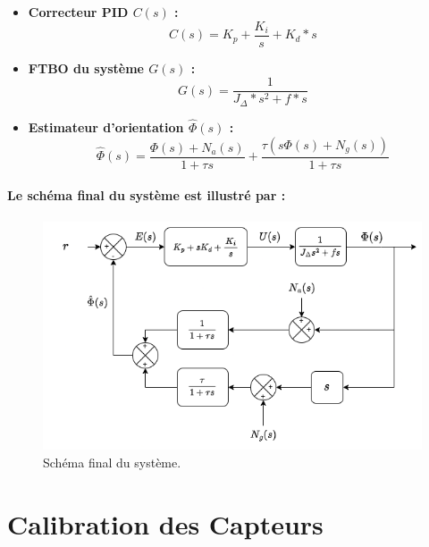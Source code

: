 \begin{itemize}
	\item \textbf{Correcteur PID $C(s)$ :} \begin{equation}
		C(s) = K_p + \frac{K_i}{s} + K_d * s
	\end{equation}
	\item \textbf{FTBO du système $G(s)$ :} \begin{equation}
		G(s) = \frac{1}{J_\Delta * s^2 + f * s}
	\end{equation}
	\item \textbf{Estimateur d'orientation $\hat{\Phi}(s)$ :} \begin{equation}
		\hat{\Phi}(s) = \frac{\Phi(s) + N_a(s)}{1 + \tau s} + \frac{\tau (s\Phi(s) + N_g(s))}{1 + \tau s}
	\end{equation}
\end{itemize}

\paragraph{Le schéma final du système est illustré par :}
\paragraph*{}
\begin{figure}[!htpb]
	\centering
	\includegraphics[width=\linewidth]{Figures/final-diagram.png}
	\caption{Schéma final du système.}
\end{figure}

\newpage

\section{Calibration des Capteurs}


